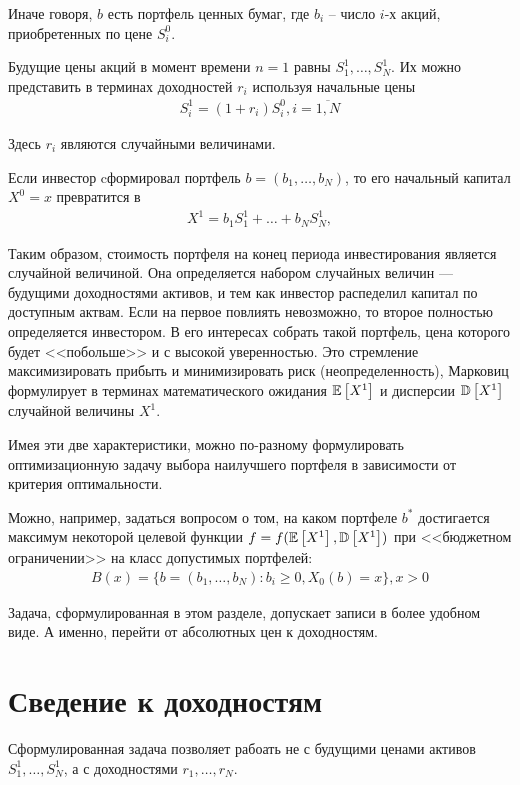 Иначе говоря, $b$ есть портфель ценных бумаг, где $b_i$ -- число $i$-х акций, приобретенных по цене $S_i^0$.

Будущие цены акций в момент времени $n=1$ равны $S_1^1, \dots, S_N^1$. 
Их можно представить в терминах доходностей $r_i$ используя начальные цены
\begin{align}
	S_i^1 = (1 + r_i) S_i^0, i=\overline{1, N}
\end{align}

Здесь $r_i$ являются случайными величинами.


Если инвестор cформировал портфель $b = (b_1, \dots, b_N )$, то его начальный капитал $X^0 = x$ превратится в 
\begin{align}
	X^1 = b_1 S_1^1 + \dots + b_N S_N^1,
\end{align}

Таким образом, стоимость портфеля на конец периода инвестирования является случайной величиной. 
Она определяется набором случайных величин --- будущими доходностями активов, и тем как инвестор распеделил капитал
по доступным актвам. Если на первое повлиять невозможно, то второе полностью определяется инвестором.
В его интересах собрать такой портфель, цена которого будет <<побольше>> и с высокой уверенностью.
Это стремление максимизировать прибыть и минимизировать риск (неопределенность), Марковиц формулирует в терминах
математического ожидания $\mathbb{E}\left[X^1\right]$ и дисперсии $\mathbb{D}\left[X^1\right]$ случайной величины $X^1$.

Имея эти две характеристики, можно по-разному формулировать оптимизационную задачу выбора наилучшего портфеля в
зависимости от критерия оптимальности.

Можно, например, задаться вопросом о том, на каком портфеле $b^*$ достигается максимум некоторой целевой функции 
$f = f(\mathbb{E}\left[X^1\right], \mathbb{D}\left[X^1\right])$ при <<бюджетном ограничении>> на класс допустимых портфелей:
\begin{align}
	B(x) = \{b=(b_1, \dots, b_N): b_i \ge 0, X_0(b) = x\}, x > 0
\end{align}

Задача, сформулированная в этом разделе, допускает записи в более удобном виде. А именно, перейти от абсолютных цен
к доходностям.

\section{Сведение к доходностям}

Сформулированная задача позволяет рабоать не с будущими ценами активов $S_1^1, \dots, S_N^1$,
а с доходностями $r_1, \dots, r_N$.

